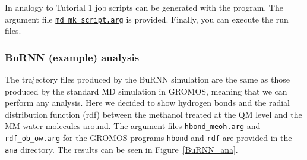 In analogy to Tutorial 1 job scripts can be generated with the  program. The argument file \href{https://github.com/LierB/gromos_tutorial_livecoms/blob/burnn_tutorial_rc/tutorial_files/t_06/md_burnn/md_mk_script.arg}{\texttt{md\_mk\_script.arg}} is provided. Finally, you can execute the run files.


\subsubsection{BuRNN (example) analysis}
The trajectory files produced by the BuRNN simulation are the same as those produced by the standard MD simulation in GROMOS, meaning that we can perform any analysis. Here we decided to show hydrogen bonds and the radial distribution function (rdf) between the methanol treated at the QM level and the MM water molecules around. The argument files \href{https://github.com/LierB/gromos_tutorial_livecoms/blob/burnn_tutorial_rc/tutorial_files/t_06/md_burnn/ana/hbond/hbond_meoh.arg}{\texttt{hbond\_meoh.arg}} and \href{https://github.com/LierB/gromos_tutorial_livecoms/blob/burnn_tutorial_rc/tutorial_files/t_06/md_burnn/ana/rdf/rdf_ob_ow.arg}{\texttt{rdf\_ob\_ow.arg}} for the GROMOS programs \texttt{hbond} and \texttt{rdf} are provided in the \texttt{ana} directory. 
The results can be seen in Figure~\ref{BuRNN_ana}.

